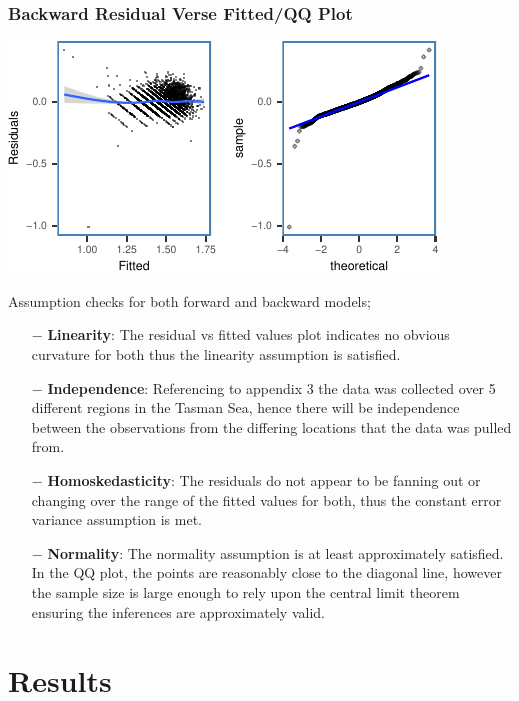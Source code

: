 \documentclass[letterpaper,9pt,twocolumn,twoside,]{pinp}
\begin{document}
\hypertarget{backward-residual-verse-fittedqq-plot}{%
\subsubsection{Backward Residual Verse Fitted/QQ
Plot}\label{backward-residual-verse-fittedqq-plot}}

\begin{center}\includegraphics{ExecSum_files/figure-latex/unnamed-chunk-5-1} \end{center}

Assumption checks for both forward and backward models;

\begin{itemize}
     \item[$-$] \textbf{Linearity}: The residual vs fitted values plot indicates no obvious curvature for both thus the linearity assumption is satisfied.
     \item[$-$] \textbf{Independence}: Referencing to appendix 3 the data was collected over 5 different regions in the Tasman Sea, hence there will be independence between the observations from the differing locations that the data was pulled from.
     \item[$-$] \textbf{Homoskedasticity}: The residuals do not appear to be fanning out or changing over the range of the fitted values for both, thus the constant error variance assumption is met.
     \item[$-$] \textbf{Normality}: The normality assumption is at least approximately satisfied. In the QQ plot, the points are reasonably close to the diagonal line, however the sample size is large enough to rely upon the central limit theorem ensuring the inferences are approximately valid.
\end{itemize}

\hypertarget{results}{%
\section{Results}\label{results}}
\end{document}
